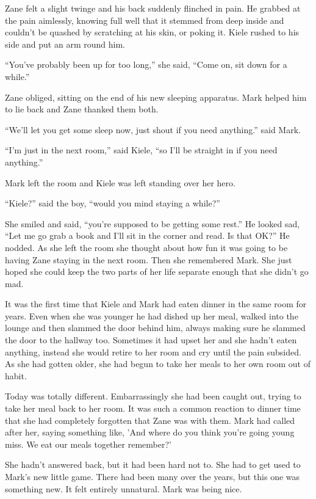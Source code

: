 Zane felt a slight twinge and his back suddenly flinched in pain.  He grabbed at the pain aimlessly, knowing full well that it stemmed from deep inside and couldn't be quashed by scratching at his skin, or poking it.  Kiele rushed to his side and put an arm round him.  

``You've probably been up for too long,'' she said, ``Come on, sit down for a while.''

Zane obliged, sitting on the end of his new sleeping apparatus.  Mark helped him to lie back and Zane thanked them both.  

``We'll let you get some sleep now, just shout if you need anything.'' said Mark.

``I'm just in the next room,'' said Kiele, ``so I'll be straight in if you need anything.''

Mark left the room and Kiele was left standing over her hero.  

``Kiele?'' said the boy, ``would you mind staying a while?''

She smiled and said, ``you're supposed to be getting some rest.''  He looked sad, ``Let me go grab a book and I'll sit in the corner and read.  Is that OK?''  He nodded.  As she left the room she thought about how fun it was going to be having Zane staying in the next room.  Then she remembered Mark.  She just hoped she could keep the two parts of her life separate enough that she didn't go mad.



\thoughtbreak



It was the first time that Kiele and Mark had eaten dinner in the same room for years.  Even when she was younger he had dished up her meal, walked into the lounge and then slammed the door behind him, always making sure he slammed the door to the hallway too.  Sometimes it had upset her and she hadn't eaten anything, instead she would retire to her room and cry until the pain subsided.  As she had gotten older, she had begun to take her meals to her own room out of habit.  

Today was totally different.  Embarrassingly she had been caught out, trying to take her meal back to her room.  It was such a common reaction to dinner time that she had completely forgotten that Zane was with them.  Mark had called after her, saying something like, 'And where do you think you're going young miss.  We eat our meals together remember?'

She hadn't answered back, but it had been hard not to.  She had to get used to Mark's new little game.  There had been many over the years, but this one was something new.  It felt entirely unnatural.  Mark was being nice.

